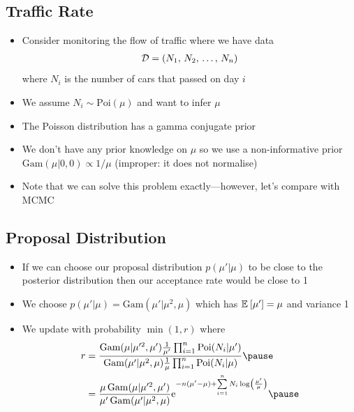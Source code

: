 \begin{slide}
\section[-2]{Traffic Rate}

\begin{PauseHighLight}
  \begin{itemize}
  \item Consider monitoring the flow of traffic where we have data
    \begin{align*}
      \mathcal{D} = (N_1,\,N_2,\,\ldots,\, N_n)
    \end{align*}
    where $N_i$ is the number of cars that passed on day $i$\pause
  \item We assume $N_i\sim\mathrm{Poi}(\mu)$ and want to infer
    $\mu$\pause
  \item The Poisson distribution has a gamma conjugate prior\pause
  \item We don't have any prior knowledge on $\mu$ so we use a
    non-informative prior $\mathrm{Gam}(\mu|0,0)\propto1/\mu$\pause{}
    (improper: it does not normalise)\pauseb
  \item Note that we can solve this problem exactly---however, let's
    compare with MCMC\pause
  \end{itemize}
\end{PauseHighLight}

\end{slide}


\begin{slide}
\section[-2]{Proposal Distribution}

\begin{PauseHighLight}
  \begin{itemize}
  \item If we can choose our proposal distribution $p(\mu'|\mu)$ to be
    close to the posterior distribution then our acceptance rate would
    be close to 1\pause
  \item We choose $p(\mu'|\mu) = \mathrm{Gam}(\mu'|\mu^2,\mu)$ which has
    $\mathbb{E}_{}\left[ \mu' \right]=\mu$ and variance 1\pause
  \item We update with probability $\min(1,r)$ where
  \begin{align*}
    r &= \frac{\mathrm{Gam}(\mu|\mu^{\prime2},\mu')
        \tfrac{1}{\mu'} \prod_{i=1}^n \mathrm{Poi}(N_i|\mu')}
        {\mathrm{Gam}(\mu'|\mu^2,\mu) \tfrac{1}{\mu}
        \prod_{i=1}^n \mathrm{Poi}(N_i|\mu)}\pause
    \\
      &= \frac{\mu\,\mathrm{Gam}(\mu|\mu^{\prime2},\mu')}
        {\mu'\,\mathrm{Gam}(\mu'|\mu^2,\mu)}
        \e{- n (\mu'-\mu) + \sum\limits_{i=1}^n N_i \logg{
        \frac{\mu'}{\mu}}}\pause
  \end{align*}
\end{itemize}
\end{PauseHighLight}

\end{slide}

